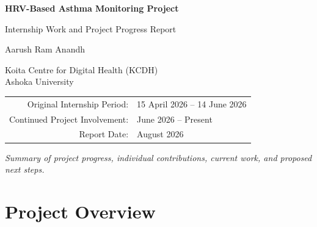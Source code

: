 \documentclass[11pt,a4paper]{article}
\begin{document}

\begin{titlepage}
    \centering

    \vspace*{2.5cm}

    {\LARGE\bfseries HRV-Based Asthma Monitoring Project\par}

    \vspace{0.4cm}

    {\Large Internship Work and Project Progress Report\par}

    \vspace{1.4cm}

    {\large Aarush Ram Anandh\par}

    \vspace{0.25cm}

    {\normalsize Koita Centre for Digital Health (KCDH)\\
    Ashoka University\par}

    \vspace{1cm}

    \begin{tabular}{rl}
        Original Internship Period: & 15 April 2026 -- 14 June 2026 \\
        Continued Project Involvement: & June 2026 -- Present \\
        Report Date: & August 2026
    \end{tabular}

    \vfill

    \textit{Summary of project progress, individual contributions, current work,
    and proposed next steps.}

    \vspace{1.2cm}

\end{titlepage}

\tableofcontents
\newpage

\section{Project Overview}
\end{document}
